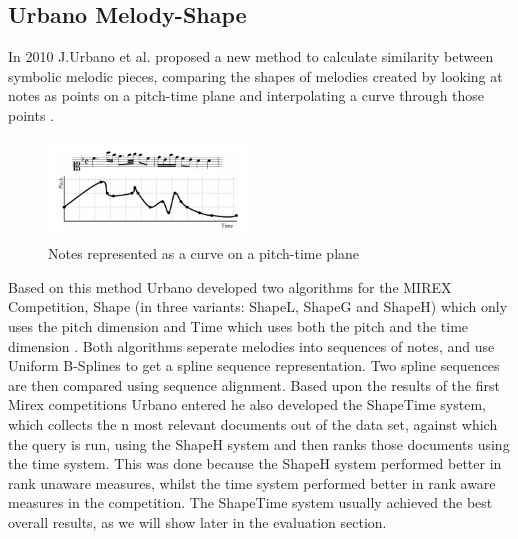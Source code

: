 \documentclass{llncs}
\begin{document}
		\subsection{Urbano Melody-Shape}
        In 2010 J.Urbano et al. proposed a new method to calculate similarity between symbolic melodic pieces, comparing the shapes of melodies created by looking at notes as points on a pitch-time plane and interpolating a curve through those points \cite{five_point_five}.
           \begin{figure}[h!]
			\centering
        \includegraphics[width=200px,height=100px,keepaspectratio]{one_of_five_point_one}
			\caption{Notes represented as a curve on a pitch-time plane \cite{five_point_two}}
        \end{figure}
        Based on this method Urbano developed two algorithms for the MIREX Competition, Shape (in three variants: ShapeL, ShapeG and ShapeH) which only uses the pitch dimension and Time which uses both the pitch and the time dimension \cite{five_point_two}. Both algorithms seperate melodies into sequences of notes, and use Uniform B-Splines to get a spline sequence representation. Two spline sequences are then compared using sequence alignment. Based upon the results of the first Mirex competitions Urbano entered he also developed the ShapeTime system, which collects the n most relevant documents out of the data set, against which the query is run, using the ShapeH system and then ranks those documents using the time system. This was done because the ShapeH system performed better in rank unaware measures, whilst the time system performed better in rank aware measures in the competition. The ShapeTime system usually achieved the best overall results, as we will show later in the evaluation section.
\end{document}
